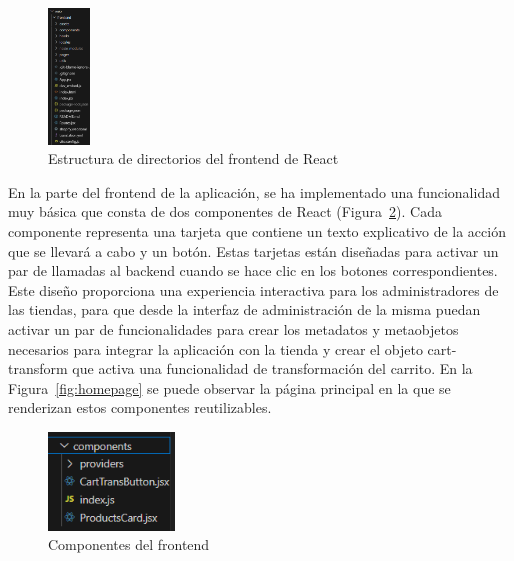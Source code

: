 \documentclass[12pt]{article}
\begin{document}
\begin{figure}[ht]
    \centering
    \includegraphics[width=0.1\textwidth]{imagenes-admin/EstructuraDirectoriosReact.png}
    \caption{\label{fig:estructuraFront} Estructura de directorios del frontend de React}
    \vspace{\fill}
\end{figure}

En la parte del frontend de la aplicación, se ha implementado una funcionalidad muy básica que consta de dos componentes de React (Figura~\ref{fig:componentes}). Cada componente representa una tarjeta que 
contiene un texto explicativo de la acción que se llevará a cabo y un botón. Estas tarjetas están diseñadas para activar un par de llamadas al backend cuando se hace clic en los 
botones correspondientes. Este diseño proporciona una experiencia interactiva para los administradores de las tiendas, para que desde la interfaz de administración de la misma
puedan activar un par de funcionalidades para crear los metadatos y metaobjetos necesarios para integrar la aplicación con la tienda y crear el objeto cart-transform que activa una funcionalidad
de transformación del carrito. En la Figura~\ref{fig:homepage} se puede observar la página principal en la que se renderizan estos componentes reutilizables.

\begin{figure}[ht]
    \centering
    \includegraphics[width=0.3\textwidth]{imagenes-admin/componentes-admin.png}
    \caption{\label{fig:componentes} Componentes del frontend }
    \vspace{\fill}
\end{figure}
\end{document}
